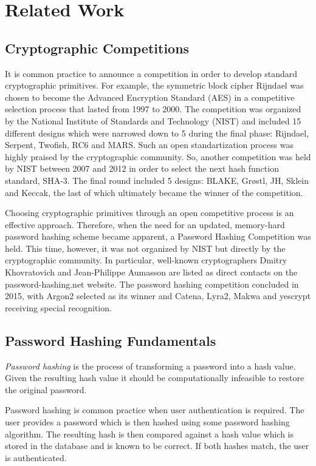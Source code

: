 \chapter{Related Work}
\label{chapter:related-work}

\section{Cryptographic Competitions}

It is common practice to announce a competition in order to develop standard cryptographic primitives. For example, the symmetric block cipher Rijndael \cite{daemen:2002:DRA} was chosen to become the Advanced Encryption Standard (AES) \cite{aes-fips} in a competitive selection process that lasted from 1997 to 2000. The competition was organized by the National Institute of Standards and Technology (NIST) and included 15 different designs which were narrowed down to 5 during the final phase: Rijndael, Serpent, Twofish, RC6 and MARS. Such an open standartization process was highly praised by the cryptographic community. So, another competition was held by NIST between 2007 and 2012 in order to select the next hash function standard, SHA-3. The final round included 5 designs: BLAKE, Grøstl, JH, Sklein and Keccak, the last of which ultimately became the winner of the competition.

Choosing cryptographic primitives through an open competitive process is an effective approach. Therefore, when the need for an updated, memory-hard password hashing scheme became apparent, a Password Hashing Competition was held. This time, however, it was not organized by NIST but directly by the cryptographic community. In particular, well-known cryptographers Dmitry Khovratovich and Jean-Philippe Aumasson are listed as direct contacts on the password-hashing.net website. The password hashing competition concluded in 2015, with Argon2 selected as its winner and Catena, Lyra2, Makwa and yescrypt receiving special recognition.

\section{Password Hashing Fundamentals}
\label{sec:fundamentals}

\emph{Password hashing} is the process of transforming a password into a hash value. Given the resulting hash value it should be computationally infeasible to restore the original password.

Password hashing is common practice when user authentication is required. The user provides a password which is then hashed using some password hashing algorithm. The resulting hash is then compared against a hash value which is stored in the database and is known to be correct. If both hashes match, the user is authenticated.

